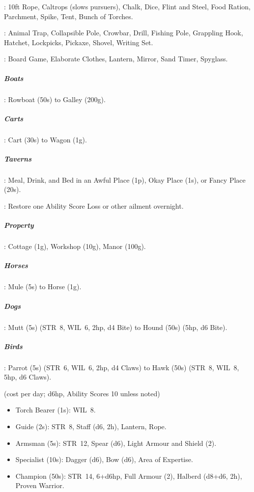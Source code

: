 \documentclass[itdr]{subfiles}
\begin{document}
: 10ft Rope, Caltrops (slows pursuers), Chalk, Dice, Flint and Steel, Food Ration, Parchment, Spike, Tent, Bunch of Torches.

: Animal Trap, Collapsible Pole, Crowbar, Drill, Fishing Pole, Grappling Hook, Hatchet, Lockpicks, Pickaxe, Shovel, Writing Set.

: Board Game, Elaborate Clothes, Lantern, Mirror, Sand Timer, Spyglass.


\subparagraph{Boats}: Rowboat (50s) to Galley (200g).
	
\subparagraph{Carts}: Cart (30s) to Wagon (1g).

\subparagraph{Taverns}: Meal, Drink, and Bed in an Awful Place (1p), Okay Place (1s), or Fancy Place (20s).

: Restore one Ability Score Loss or other ailment overnight.

\subparagraph{Property}: Cottage (1g), Workshop (10g), Manor (100g).

\subparagraph{Horses}: Mule (5s) to Horse (1g).

\subparagraph{Dogs}: Mutt (5s) (STR~8, WIL~6, 2hp, d4 Bite) to Hound (50s) (5hp, d6 Bite).

\subparagraph{Birds}: Parrot (5s) (STR~6, WIL~6, 2hp, d4 Claws) to Hawk (50s) (STR~8, WIL~8, 5hp, d6 Claws).

 (cost per day; d6hp, Ability Scores 10
unless noted)
\begin{itemize}
	\item Torch Bearer (1s): WIL~8.
	\item Guide (2s): STR~8, Staff (d6, 2h), Lantern, Rope.
	\item Armsman (5s): STR~12, Spear (d6), Light Armour and Shield (2).
	\item Specialist (10s): Dagger (d6), Bow (d6), Area of Expertise.
	\item Champion (50s): STR~14, 6+d6hp, Full Armour (2), Halberd (d8+d6, 2h), Proven Warrior.
\end{itemize}

\break

\end{document}
